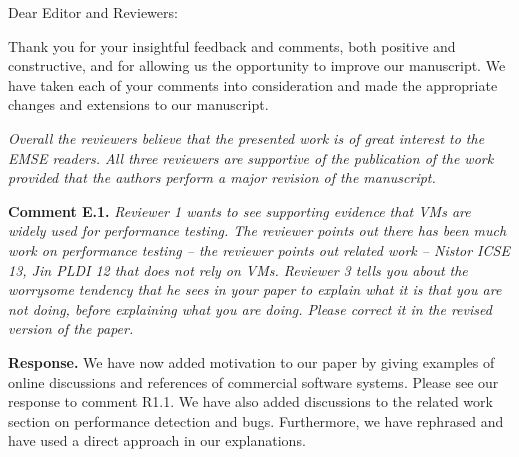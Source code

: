 \documentclass[8pt]{letter} %
\begin{document}
\let\raggedleft\raggedright                %

\newcommand{\response}[1]{{\bf Response.} #1}

\newcommand{\comment}[2]{
  \stepcounter{commentCounter}
  \vspace{2em}
  {\bf Comment R#1.\arabic{commentCounter}.} {\em #2}
  }
  
  
\newcommand{\ian}[1]{\textcolor{blue}{{\it [Ian: #1]}}}

\begin{letter}{}

\address{
Muhammad Moiz Arif\\
EV 3.274, 1515 Saint-Catherine Street West\\
Department of Computer Science and Software Engineering, Concordia University\\ 
Montreal, QC, Canada H3G 2W1 \\
} 



\opening{Dear Editor and Reviewers:} 
 
\noindent Thank you for your insightful feedback and comments, both positive and constructive, and for allowing us the opportunity to improve our manuscript. We have taken each of your comments into consideration and made the appropriate changes and extensions to our manuscript. 


\vspace{2em}

\emph{Overall the reviewers believe that the presented work is of great interest to the EMSE readers. All three reviewers are supportive of the publication of the work provided that the authors perform a major revision of the manuscript.	}

{\bf Comment E.1.}	
\emph{Reviewer 1 wants to see supporting evidence that VMs are widely used for performance testing. The reviewer points out there has been much work on performance testing -- the reviewer points out related work -- Nistor ICSE 13, Jin PLDI 12 that does not rely on VMs. Reviewer 3 tells you about the worrysome tendency that he sees in your paper to explain what it is that you are not doing, before explaining what you are doing. Please correct it in the revised version of the paper.}

	\response{We have now added motivation to our paper by giving examples of online discussions and references of commercial software systems. Please see our response to comment R1.1. We have also added discussions to the related work section on performance detection and bugs. Furthermore, we have rephrased and have used a direct approach in our explanations.}


\end{letter}
\end{document}
